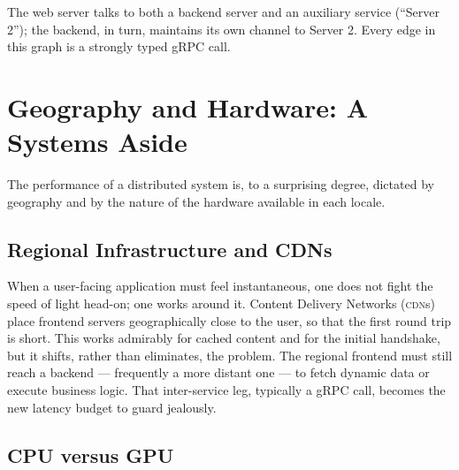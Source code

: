 \documentclass[11pt,a4paper]{article}
\theoremstyle{definition}
\theoremstyle{remark}
\begin{document}
\begin{center}
\end{center}

The web server talks to both a backend server and an auxiliary service (``Server 2''); the backend, in turn, maintains its own channel to Server 2. Every edge in this graph is a strongly typed gRPC call.

\section{Geography and Hardware: A Systems Aside}


The performance of a distributed system is, to a surprising degree, dictated by geography and by the nature of the hardware available in each locale.

\subsection{Regional Infrastructure and CDNs}

When a user-facing application must feel instantaneous, one does not fight the speed of light head-on; one works around it. Content Delivery Networks (\textsc{cdn}s) place frontend servers geographically close to the user, so that the first round trip is short. This works admirably for cached content and for the initial handshake, but it shifts, rather than eliminates, the problem. The regional frontend must still reach a backend --- frequently a more distant one --- to fetch dynamic data or execute business logic. That inter-service leg, typically a gRPC call, becomes the new latency budget to guard jealously.

\subsection{CPU versus GPU}
\end{document}
